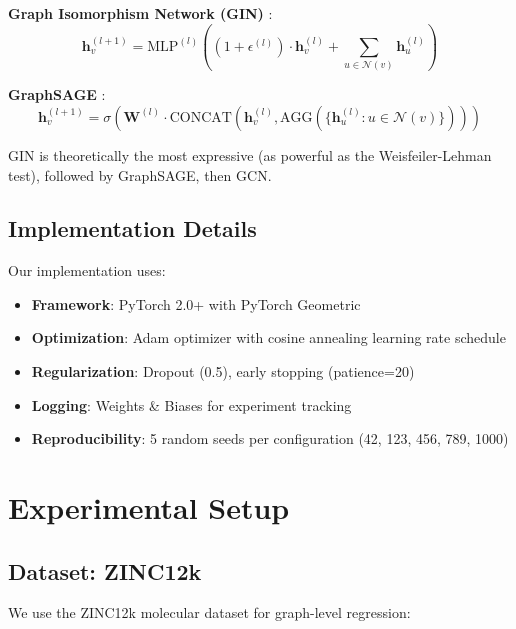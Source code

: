\documentclass[11pt,a4paper]{article}
\begin{document}
\textbf{Graph Isomorphism Network (GIN)} \cite{xu2019gin}:
\begin{equation}
    \mathbf{h}_v^{(l+1)} = \text{MLP}^{(l)}\left( (1 + \epsilon^{(l)}) \cdot \mathbf{h}_v^{(l)} + \sum_{u \in \mathcal{N}(v)} \mathbf{h}_u^{(l)} \right)
\end{equation}

\textbf{GraphSAGE} \cite{hamilton2017graphsage}:
\begin{equation}
    \mathbf{h}_v^{(l+1)} = \sigma\left( \mathbf{W}^{(l)} \cdot \text{CONCAT}\left( \mathbf{h}_v^{(l)}, \text{AGG}(\{\mathbf{h}_u^{(l)} : u \in \mathcal{N}(v)\}) \right) \right)
\end{equation}

GIN is theoretically the most expressive (as powerful as the Weisfeiler-Lehman test), followed by GraphSAGE, then GCN.

\subsection{Implementation Details}

Our implementation uses:
\begin{itemize}
    \item \textbf{Framework}: PyTorch 2.0+ with PyTorch Geometric
    \item \textbf{Optimization}: Adam optimizer with cosine annealing learning rate schedule
    \item \textbf{Regularization}: Dropout (0.5), early stopping (patience=20)
    \item \textbf{Logging}: Weights \& Biases for experiment tracking
    \item \textbf{Reproducibility}: 5 random seeds per configuration (42, 123, 456, 789, 1000)
\end{itemize}

\section{Experimental Setup}

\subsection{Dataset: ZINC12k}

We use the ZINC12k molecular dataset for graph-level regression:
\end{document}
